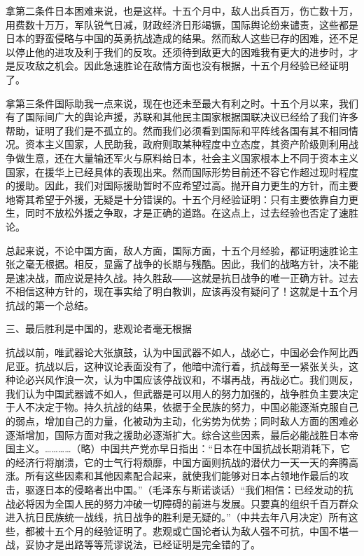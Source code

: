 拿第二条件日本困难来说，也是这样。十五个月中，敌人出兵百万，伤亡数十万，用费数十万万，军队锐气日减，财政经济日形竭镢，国际舆论纷来谴责，这些都是日本的野蛮侵略与中国的英勇抗战造成的结果。然而敌人这些已存的困难，还不足以停止他的进攻及利于我们的反攻。还须待到敌更大的困难我有更大的进步时，才是反攻敌之机会。因此急速胜论在敌情方面也没有根据，十五个月经验已经证明了。

拿第三条件国际助我一点来说，现在也还未至最大有利之时。十五个月以来，我们有了国际间广大的舆论声援，苏联和其他民主国家根据国联决议已经给了我们许多帮助，证明了我们是不孤立的。然而我们必须看到国际和平阵线各国有其不相同情况。资本主义国家，人民助我，政府则取某种程度中立态度，其资产阶级则利用战争做生意，还在大量输还军火与原料给日本，社会主义国家根本上不同于资本主义国家，在援华上已经具体的表现出来。然而国际形势目前还不容它作超过现时程度的援助。因此，我们对国际援助暂时不应希望过高。抛开自力更生的方针，而主要地寄其希望于外援，无疑是十分错误的。十五个月经验证明：只有主要依靠自力更生，同时不放松外援之争取，才是正确的道路。在这点上，过去经验也否定了速胜论。

总起来说，不论中国方面，敌人方面，国际方面，十五个月经验，都证明速胜论主张之毫无根据。相反，显露了战争的长期与残酷。因此，我们的战略方针，决不能是速决战，而应说是持久战。持久胜敌――这就是抗日战争的唯一正确方针。过去不相信这种方针的，现在事实给了明白教训，应该再没有疑问了！这就是十五个月抗战的第一个总结。

三、最后胜利是中国的，悲观论者毫无根据

抗战以前，唯武器论大张旗鼓，认为中国武器不如人，战必亡，中国必会作阿比西尼亚。抗战以后，这种议论表面没有了，他暗中流行着，抗战每至一紧张关头，这种论必兴风作浪一次，认为中国应该停战议和，不堪再战，再战必亡。我们则反，我们认为中国武器诚不如人，但武器是可以用人的努力加强的，战争胜负主要决定于人不决定于物。持久抗战的结果，依据于全民族的努力，中国必能逐渐克服自己的弱点，增加自己的力量，化被动为主动，化劣势为优势；同时敌人方面的困难必逐渐增加，国际方面对我之援助必逐渐扩大。综合这些因素，最后必能战胜日本帝国主义。…………（略）中国共产党亦早日指出：“日本在中国抗战长期消耗下，它的经济行将崩溃，它的士气行将颓靡，中国方面则抗战的潜伏力一天一天的奔腾高涨。所有这些因素和其他因素配合起来，就使我们能够对日本占领地作最后的攻击，驱逐日本的侵略者出中国。”（毛泽东与斯诺谈话）“我们相信：已经发动的抗战必将因为全国人民的努力冲破一切障碍的前进与发展。只要真的组织千百万群众进入抗日民族统一战线，抗日战争的胜利是无疑的。”（中共去年八月决定）所有这些，都被十五个月的经验证明了。悲观或亡国论者认为敌人强不可抗，中国不堪一战，妥协才是出路等等荒谬说法，已经证明是完全错的了。

